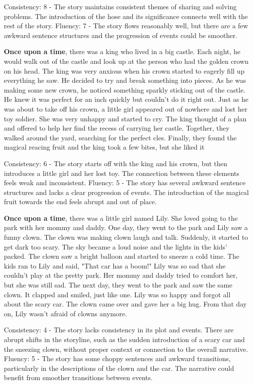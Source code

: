 \documentclass{article}
\begin{document}
Consistency: 8 - The story maintains consistent themes of sharing and solving problems. The introduction of the hose and its significance connects well with the rest of the story.
Fluency: 7 - The story flows reasonably well, but there are a few awkward sentence structures and the progression of events could be smoother.

\textbf{Once upon a time}, there was a king who lived in a big castle. Each night, he would walk out of the castle and look up at the person who had the golden crown on his head. The king was very anxious when his crown started to eagerly fill up everything he saw. He decided to try and break something into pieces. As he was making some new crown, he noticed something sparkly sticking out of the castle. He knew it was perfect for an inch quickly but couldn't do it right out. Just as he was about to take off his crown, a little girl appeared out of nowhere and lost her toy soldier. She was very unhappy and started to cry. The king thought of a plan and offered to help her find the recess of carrying her castle. Together, they walked around the yard, searching for the perfect cles. Finally, they found the magical reacing fruit and the king took a few bites, but she liked it

Consistency: 6 - The story starts off with the king and his crown, but then introduces a little girl and her lost toy. The connection between these elements feels weak and inconsistent.
Fluency: 5 - The story has several awkward sentence structures and lacks a clear progression of events. The introduction of the magical fruit towards the end feels abrupt and out of place.

\textbf{Once upon a time}, there was a little girl named Lily. She loved going to the park with her mommy and daddy. One day, they went to the park and Lily saw a funny clown. The clown was making clown laugh and talk. Suddenly, it started to get dark too scary. The sky became a loud noise and the lights in the kids' packed. The clown saw a bright balloon and started to sneeze a cold time. The kids ran to Lily and said, "That car has a boom!" Lily was so sad that she couldn't play at the pretty park. Her mommy and daddy tried to comfort her, but she was still sad. The next day, they went to the park and saw the same clown. It clapped and smiled, just like one. Lily was so happy and forgot all about the scary car. The clown came over and gave her a big hug. From that day on, Lily wasn't afraid of clowns anymore.

Consistency: 4 - The story lacks consistency in its plot and events. There are abrupt shifts in the storyline, such as the sudden introduction of a scary car and the sneezing clown, without proper context or connection to the overall narrative.
Fluency: 5 - The story has some choppy sentences and awkward transitions, particularly in the descriptions of the clown and the car. The narrative could benefit from smoother transitions between events.
\end{document}
